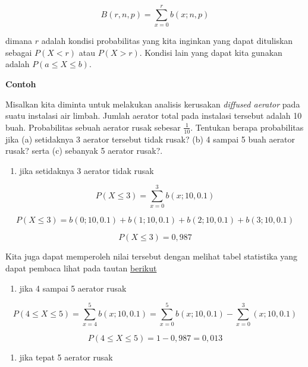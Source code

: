 \documentclass[]{book}
\providecommand{\tightlist}{%
  \setlength{\itemsep}{0pt}\setlength{\parskip}{0pt}}
\begin{document}
\begin{equation}
   B\left(r,n,p\right)=\sum_{x=0}^rb\left(x;n,p\right)
  \label{eq:dbinom3}
\end{equation}

dimana \(r\) adalah kondisi probabilitas yang kita inginkan yang dapat
dituliskan sebagai \(P\left(X<r\right)\) atau \(P\left(X>r\right)\).
Kondisi lain yang dapat kita gunakan adalah
\(P\left(a\le X\le b\right)\).

\textbf{Contoh}

Misalkan kita diminta untuk melakukan analisis kerusakan \emph{diffused
aerator} pada suatu instalasi air limbah. Jumlah aerator total pada
instalasi tersebut adalah 10 buah. Probabilitas sebuah aerator rusak
sebesar \(\frac{1}{10}\). Tentukan berapa probabilitas jika (a)
setidaknya 3 aerator tersebut tidak rusak? (b) 4 sampai 5 buah aerator
rusak? serta (c) sebanyak 5 aerator rusak?.

\begin{enumerate}
\def\labelenumi{(\alph{enumi})}
\tightlist
\item
  jika setidaknya 3 aerator tidak rusak
\end{enumerate}

\[
P\left(X\le 3\right)=\sum _{x=0}^3b\left(x;10,0.1\right)
\]

\[
P\left(X\le3\right)=b\left(0;10,0.1\right)+b\left(1;10,0.1\right)+b\left(2;10,0.1\right)+b\left(3;10,0.1\right)
\]

\[
P\left(X\le3\right)=0,987
\]

Kita juga dapat memperoleh nilai tersebut dengan melihat tabel
statistika yang dapat pembaca lihat pada tautan
\href{https://onlinepubs.trb.org/onlinepubs/nchrp/cd-22/manual/v2appendixc.pdf}{berikut}

\begin{enumerate}
\def\labelenumi{(\alph{enumi})}
\setcounter{enumi}{1}
\tightlist
\item
  jika 4 sampai 5 aerator rusak
\end{enumerate}

\[
P\left(4\le X\le5\right)=\sum_{x=4}^5b\left(x;10,0.1\right)=\sum_{x=0}^5b\left(x;10,0.1\right)-\sum_{x=0}^3\left(x;10,0.1\right)
\]

\[
P\left(4\le X\le5\right)=1-0,987=0,013
\]

\begin{enumerate}
\def\labelenumi{(\alph{enumi})}
\setcounter{enumi}{2}
\tightlist
\item
  jika tepat 5 aerator rusak
\end{enumerate}
\end{document}
